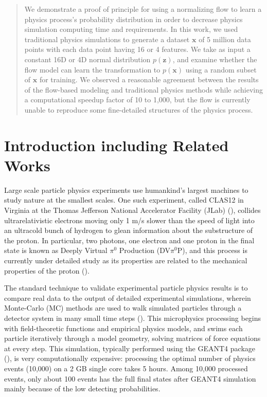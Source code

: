 \begin{abstract}
We demonstrate a proof of principle for using a normalizing flow to learn a physics process's probability distribution in order to decrease physics simulation computing time and requirements. In this work, we used traditional physics simulations to generate a dataset $\mathbf{x}$ of 5 million data points with each data point having 16 or 4 features.  We take as input a constant 16D or 4D normal distribution $p(\mathbf{z})$, and examine whether the flow model can learn the transformation to $p(\mathbf{x})$ using a random subset of $\mathbf{x}$ for training. We observed a reasonable agreement between the results of the flow-based modeling and traditional physics methods while achieving a computational speedup factor of 10 to 1,000, but the flow is currently unable to reproduce some fine-detailed structures of the physics process.
\end{abstract}
\section{Introduction including Related Works }

Large scale particle physics experiments use humankind's largest machines to study nature at the smallest scales. One such experiment, called CLAS12 in Virginia at the Thomas Jefferson National Accelerator Facility (JLab) (\citet{BURKERT2020163419}), collides ultrarelativistic electrons moving only 1 m/s slower than the speed of light into an ultracold bunch of hydrogen to glean information about the substructure of the proton. In particular, two photons, one electron and one proton in the final state is known as Deeply Virtual $\pi^0$ Production (DV$\pi^0$P), and this process is currently under detailed study as its properties are related to the mechanical properties of the proton (\citet{PhysRevD.55.7114}).

The standard technique to validate experimental particle physics results is to compare real data to the output of detailed experimental simulations, wherein Monte-Carlo (MC) methods are used to walk simulated particles through a detector system in many small time steps (\citet{PhysRevLett.115.212003, 10.1093/ptep/ptaa104}). This microphysics processing begins with field-theoretic functions and empirical physics models, and swims each particle iteratively through a model geometry, solving matrices of force equations at every step. This simulation, typically performed using the GEANT4 package (\citet{AGOSTINELLI2003250}), is very computationally expensive: processing the optimal number of physics events (10,000) on a 2 GB single core takes 5 hours. Among 10,000 processed events, only about 100 events has the full final states after GEANT4 simulation mainly because of the low detecting probabilities.

